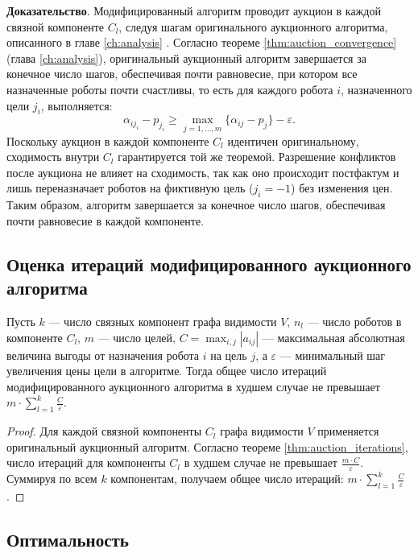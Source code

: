 \textbf{Доказательство}. 
Модифицированный алгоритм проводит аукцион в каждой связной компоненте \( C_l \), следуя шагам оригинального аукционного алгоритма, описанного в главе \ref{ch:analysis} \cite{bertsekas1990}. Согласно теореме \ref{thm:auction_convergence} (глава \ref{ch:analysis}), оригинальный аукционный алгоритм завершается за конечное число шагов, обеспечивая почти равновесие, при котором все назначенные роботы почти счастливы, то есть для каждого робота \( i \), назначенного цели \( j_i \), выполняется:
\[
\alpha_{i j_i} - p_{j_i} \geq \max_{j=1,\ldots,m} \{\alpha_{ij} - p_j\} - \varepsilon.
\]
Поскольку аукцион в каждой компоненте \( C_l \) идентичен оригинальному, сходимость внутри \( C_l \) гарантируется той же теоремой. Разрешение конфликтов после аукциона не влияет на сходимость, так как оно происходит постфактум и лишь переназначает роботов на фиктивную цель (\( j_i = -1 \)) без изменения цен. Таким образом, алгоритм завершается за конечное число шагов, обеспечивая почти равновесие в каждой компоненте.

\subsection{Оценка итераций модифицированного аукционного алгоритма}

\begin{theorem}
\label{thm:mod_auction_iterations}
Пусть \( k \) — число связных компонент графа видимости \( V \), \( n_l \) — число роботов в компоненте \( C_l \), \( m \) — число целей, \( C = \max_{i,j} |a_{ij}| \) — максимальная абсолютная величина выгоды от назначения робота \( i \) на цель \( j \), а \( \varepsilon \) — минимальный шаг увеличения цены цели в алгоритме. Тогда общее число итераций модифицированного аукционного алгоритма в худшем случае не превышает \(m \cdot \sum_{l=1}^k \frac{C}{\varepsilon}\).
\end{theorem}

\begin{proof}
Для каждой связной компоненты \( C_l \) графа видимости \( V \) применяется оригинальный аукционный алгоритм. Согласно теореме \ref{thm:auction_iterations}, число итераций для компоненты \( C_l \) в худшем случае не превышает \( \frac{m \cdot C}{\varepsilon} \). Суммируя по всем \( k \) компонентам, получаем общее число итераций: \(m \cdot \sum_{l=1}^k \frac{C}{\varepsilon}\).
\end{proof}
\subsection{Оптимальность}

